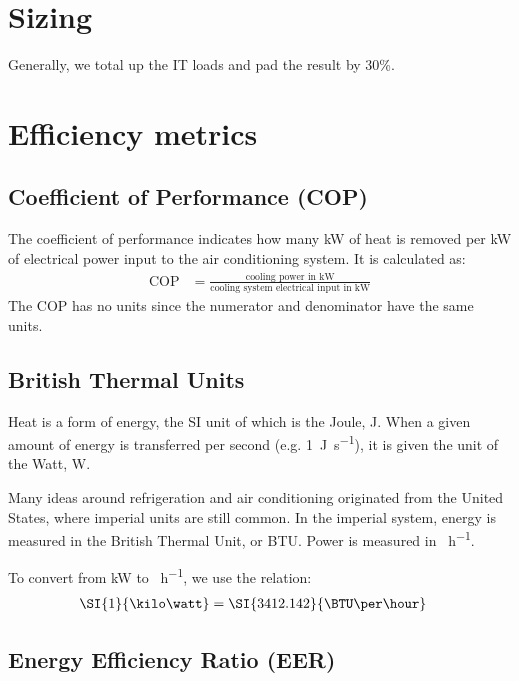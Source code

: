 \documentclass{pgnotes}
\begin{document}
\section{Sizing}

Generally, we total up the IT loads and pad the result by 30\%.

\newpage
\section{Efficiency metrics}

\subsection{Coefficient of Performance (COP)}

The coefficient of performance indicates how many \si{\kilo\watt} of heat is removed per \si{\kilo\watt} of electrical power input to the air conditioning system.
It is calculated as:
\begin{align}
  \mbox{COP} & = \frac{\mbox{cooling power in kW}}{\mbox{cooling system electrical input in kW}}
\end{align}
The COP has no units since the numerator and denominator have the same units.


\subsection{British Thermal Units}

Heat is a form of energy, the SI unit of which is the Joule, \si{\joule}.
When a given amount of energy is transferred per second (e.g. \SI{1}{\joule\per\second}), it is given the unit of the Watt, \si{\watt}.

Many ideas around refrigeration and air conditioning originated from the United States, where imperial units are still common.
In the imperial system, energy is measured in the British Thermal Unit, or BTU.
Power is measured in \si{\BTU\per\hour}. 

To convert from \si{\kilo\watt} to \si{\BTU\per\hour}, we use the relation:
\begin{align}
  \SI{1}{\kilo\watt} & = \SI{3412.142}{\BTU\per\hour}
\end{align}

\subsection{Energy Efficiency Ratio (EER)}
\end{document}
